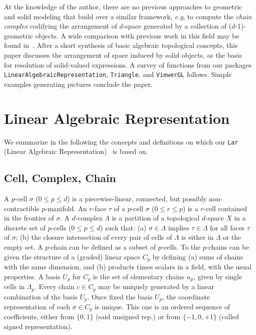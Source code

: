 \documentclass{juliacon}
\begin{document}
At the knowledge of the author, there are no previous approaches to geometric and solid modeling that build over a similar framework, \emph{e.g}, to compute the \emph{chain complex} codifying the arrangement of $d$-space generated by a collection of ($d$-1)-geometric objects. A wide comparison with previous work in this field may be found in~\cite{TSAS:17,Dicarlo:2014:TNL:2543138.2543294}. 
After a short synthesis of basic algebraic topological 
concepts, this paper discusses the arrangement of space induced by solid objects, as the basis for resolution of solid-valued expressions. A survey of functions from our packages \texttt{LinearAlgebraicRepresentation}, \texttt{Triangle}, and \texttt{ViewerGL} follows. Simple examples generating pictures conclude the paper.

\section{Linear Algebraic Representation}

We summarize  in the following the concepts and definitions on which our \texttt{Lar} (Linear Algebraic Representation)~\cite{Dicarlo:2014:TNL:2543138.2543294} is based on. 

\subsection{Cell, Complex, Chain}
A $p$-cell $\sigma$ ($0\leq p\leq d$) is a piecewise-linear, connected, but possibly non-contractible $p$-manifold. An $r$-face $\tau$ of a $p$-cell $\sigma$ ($0\leq r\leq p$) is a $r$-cell contained in the frontier of $\sigma$.
A $d$-complex $\Lambda$ is a partition of a topological $d$-space $X$ in a discrete set of $p$-cells ($0\leq p\leq d$) such that: (a) $\sigma\in \Lambda$ implies $\tau\in \Lambda$ for all faces $\tau$ of $\sigma$; (b) the closure intersection of every pair of cells of $\Lambda$ is either in $\Lambda$ or the empty set. A $p$-chain can be defined as a subset of $p$-cells. To the $p$-chains can be given the structure of a (graded) linear space $C_p$ by defining (a) sums of chains with the same dimension, and (b) products times scalars in a field, with the usual properties. A basis $U_p$ for $C_p$ is the set of elementary chains $u_p$, given by single cells in $\Lambda_p$. Every chain $c\in C_p$ may be uniquely generated by a linear combination of the basis $U_p$. Once fixed the basis $U_p$, the coordinate representation of each $\sigma\in C_p$ is unique. This one is an ordered sequence of coefficients, either from $\{0,1\}$ (said unsigned rep.) or from $\{-1,0,+1\}$ (called signed representation).
\end{document}
